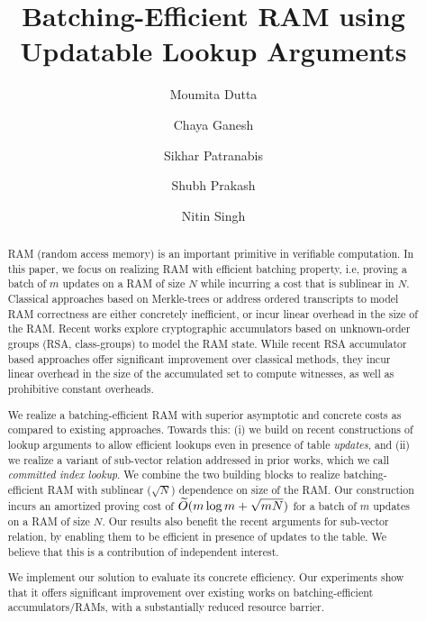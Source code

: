 \documentclass{llncs}
\title{Batching-Efficient RAM using Updatable Lookup Arguments}
\author{Moumita Dutta\inst{1} \and Chaya Ganesh\inst{1} \and Sikhar Patranabis\inst{2} \and Shubh Prakash\inst{1} \and Nitin Singh\inst{2}}
\institute{Indian Institute of Science\\
	\email{\{moumitadutta,chaya,shubhprakash\}@iisc.ac.in}
	\and
	IBM Research, India \\
	\email{sikharpatranabis@ibm.com,nitisin1@in.ibm.com}
}
\begin{document}
	
	\maketitle
	
	\begin{abstract}

		RAM (random access memory) is an important primitive in verifiable computation. In this paper, we focus on realizing RAM with efficient batching property, i.e, proving a batch of $m$ updates on a RAM of size $N$ while incurring a cost that is sublinear in $N$. Classical approaches based on Merkle-trees or address ordered transcripts to model RAM correctness are either concretely inefficient, or incur linear overhead in the size of the RAM. Recent works explore cryptographic accumulators based on unknown-order groups (RSA, class-groups) to model the RAM state. While recent RSA accumulator based approaches offer significant improvement over classical methods, they incur linear overhead in the size of the accumulated set to compute witnesses, as well as prohibitive constant overheads.
		
		\medskip
		
		We realize a batching-efficient RAM with superior asymptotic and concrete costs as compared to existing approaches. Towards this: (i) we build on recent constructions of lookup arguments to allow efficient lookups even in presence of table \textit{updates}, and (ii) we realize a variant of sub-vector relation addressed in prior works, which we call {\em committed index lookup}. We combine the two building blocks to realize batching-efficient RAM with sublinear ($\sqrt{N}$) dependence on size of the RAM. Our construction incurs an amortized proving cost of $\widetilde{O}(m\log m + \sqrt{mN})$ for a batch of $m$ updates on a RAM of size $N$. Our results also benefit the recent arguments for sub-vector relation, by enabling them to be efficient in presence of updates to the table. We believe that this is a contribution of independent interest. 
		
		\medskip

		We implement our solution to evaluate its concrete efficiency. Our experiments show that it offers significant improvement over existing works on batching-efficient accumulators/RAMs, with a substantially reduced resource barrier.


	\end{abstract}
	
	\thispagestyle{plain}
	
	\pagestyle{plain}
	
\end{document}
